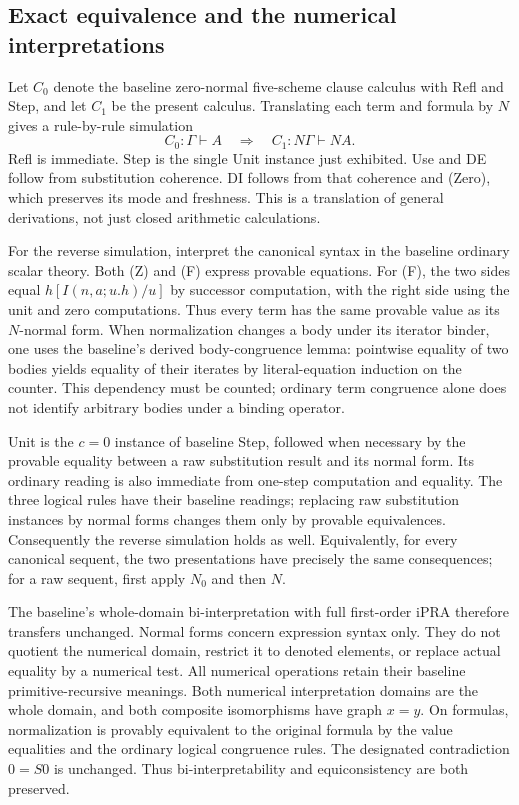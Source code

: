 \subsection{Exact equivalence and the numerical interpretations}

Let $C_0$ denote the baseline zero-normal five-scheme clause calculus
with Refl and Step, and let $C_1$ be the present calculus.  Translating
each term and formula by $N$ gives a rule-by-rule simulation
\[
       C_0:\Gamma\vdash A\quad\Longrightarrow\quad
       C_1:N\Gamma\vdash NA.
\]
Refl is immediate.  Step is the single Unit instance just exhibited.
Use and DE follow from substitution coherence.  DI follows from that
coherence and (Zero), which preserves its mode and freshness.  This is
a translation of general derivations, not just closed arithmetic
calculations.

For the reverse simulation, interpret the canonical syntax in the
baseline ordinary scalar theory.  Both (Z) and (F) express provable
equations.  For (F), the two sides equal $h[I(n,a;u.h)/u]$ by successor
computation, with the right side using the unit and zero computations.
Thus every term has the same provable value as its $N$-normal form.
When normalization changes a body under its iterator binder, one uses
the baseline's derived body-congruence lemma: pointwise equality of
two bodies yields equality of their iterates by literal-equation
induction on the counter.  This dependency must be counted; ordinary
term congruence alone does not identify arbitrary bodies under a
binding operator.

Unit is the $c=0$ instance of baseline Step, followed when necessary
by the provable equality between a raw substitution result and its
normal form.  Its ordinary reading is also immediate from one-step
computation and equality.  The three logical rules have their baseline
readings; replacing raw substitution instances by normal forms changes
them only by provable equivalences.  Consequently the reverse
simulation holds as well.  Equivalently, for every canonical sequent,
the two presentations have precisely the same consequences; for a raw
sequent, first apply $N_0$ and then $N$.

The baseline's whole-domain bi-interpretation with full first-order
iPRA therefore transfers unchanged.  Normal forms concern expression
syntax only.  They do not quotient the numerical domain, restrict it
to denoted elements, or replace actual equality by a numerical test.
All numerical operations retain their baseline primitive-recursive
meanings.  Both numerical interpretation domains are the whole domain,
and both composite isomorphisms have graph $x=y$.  On formulas,
normalization is provably equivalent to the original formula by the
value equalities and the ordinary logical congruence rules.  The
designated contradiction $0=S0$ is unchanged.  Thus bi-interpretability
and equiconsistency are both preserved.

